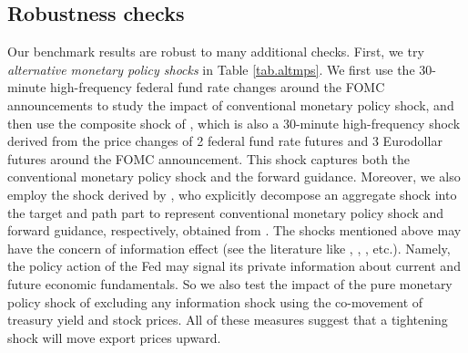 \subsection{Robustness checks}

Our benchmark results are robust to many additional checks. First, we try \textit{alternative monetary policy shocks} in Table \ref{tab.altmps}. We first use the 30-minute high-frequency federal fund rate changes around the FOMC announcements to study the impact of conventional monetary policy shock, and then use the composite shock of \cite{nakamura2018high}, which is also a 30-minute high-frequency shock derived from the price changes of 2 federal fund rate futures and 3 Eurodollar futures around the FOMC announcement. This shock captures both the conventional monetary policy shock and the forward guidance. Moreover, we also employ the shock derived by \cite{guraynak2005actions}, who explicitly decompose an aggregate shock into the target and path part to represent conventional monetary policy shock and forward guidance, respectively, obtained from \cite{acosta2022perceived}. The shocks mentioned above may have the concern of information effect (see the literature like \cite{nakamura2018high}, \cite{jarocinski2020deconstructing}, \cite{acosta2022perceived}, etc.). Namely, the policy action of the Fed may signal its private information about current and future economic fundamentals. So we also test the impact of the pure monetary policy shock of \cite{jarocinski2020deconstructing} excluding any information shock using the co-movement of treasury yield and stock prices. All of these measures suggest that a tightening shock will move export prices upward.

